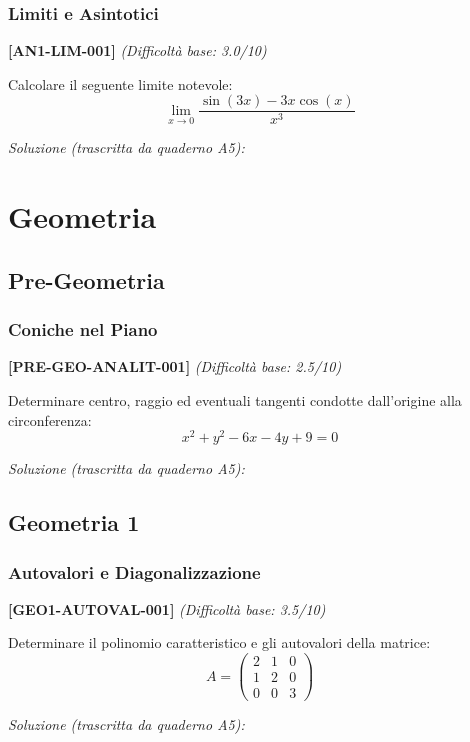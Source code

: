 \documentclass[11pt,a4paper]{book}
\newenvironment{esercizio}[2]{%
  \par\medskip\noindent\textbf{[#1]} \textit{(Difficoltà base: #2/10)}\par\noindent\ignorespaces
}{\par\medskip}
\newenvironment{soluzione}{%
  \par\noindent\textit{Soluzione (trascritta da quaderno A5):}\par\noindent\ignorespaces
}{\par\bigskip}
\begin{document}
\section{Limiti e Asintotici}

\begin{esercizio}{AN1-LIM-001}{3.0}
Calcolare il seguente limite notevole:
$$\lim_{x \to 0} \frac{\sin(3x) - 3x\cos(x)}{x^3}$$
\end{esercizio}
\begin{soluzione}
\end{soluzione}

\part{Geometria}

\chapter{Pre-Geometria}

\section{Coniche nel Piano}

\begin{esercizio}{PRE-GEO-ANALIT-001}{2.5}
Determinare centro, raggio ed eventuali tangenti condotte dall'origine alla circonferenza:
$$x^2 + y^2 - 6x - 4y + 9 = 0$$
\end{esercizio}
\begin{soluzione}
\end{soluzione}

\chapter{Geometria 1}

\section{Autovalori e Diagonalizzazione}

\begin{esercizio}{GEO1-AUTOVAL-001}{3.5}
Determinare il polinomio caratteristico e gli autovalori della matrice:
$$A = \begin{pmatrix} 2 & 1 & 0 \\ 1 & 2 & 0 \\ 0 & 0 & 3 \end{pmatrix}$$
\end{esercizio}
\begin{soluzione}
\end{soluzione}
\end{document}
